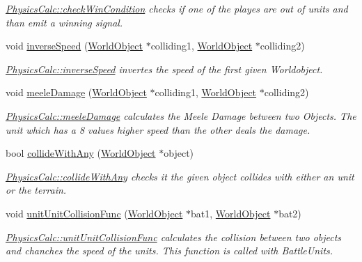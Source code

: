 \begin{DoxyCompactItemize}
\begin{DoxyCompactList}\small\item\em \hyperlink{class_physics_calc_a611a891e2f01de112884cc09f25d1e33}{Physics\+Calc\+::check\+Win\+Condition} checks if one of the playes are out of units and than emit a winning signal. \end{DoxyCompactList}\item 
void \hyperlink{class_physics_calc_a22379e7ef119411e03fc8c4ba211c724}{inverse\+Speed} (\hyperlink{class_world_object}{World\+Object} $\ast$colliding1, \hyperlink{class_world_object}{World\+Object} $\ast$colliding2)
\begin{DoxyCompactList}\small\item\em \hyperlink{class_physics_calc_a22379e7ef119411e03fc8c4ba211c724}{Physics\+Calc\+::inverse\+Speed} invertes the speed of the first given Worldobject. \end{DoxyCompactList}\item 
void \hyperlink{class_physics_calc_a10a603c3fb290521b301a19600c067c4}{meele\+Damage} (\hyperlink{class_world_object}{World\+Object} $\ast$colliding1, \hyperlink{class_world_object}{World\+Object} $\ast$colliding2)
\begin{DoxyCompactList}\small\item\em \hyperlink{class_physics_calc_a10a603c3fb290521b301a19600c067c4}{Physics\+Calc\+::meele\+Damage} calculates the Meele Damage between two Objects. The unit which has a 8 values higher speed than the other deals the damage. \end{DoxyCompactList}\item 
bool \hyperlink{class_physics_calc_a8529b4af50316ef96a6bcbd029c39077}{collide\+With\+Any} (\hyperlink{class_world_object}{World\+Object} $\ast$object)
\begin{DoxyCompactList}\small\item\em \hyperlink{class_physics_calc_a8529b4af50316ef96a6bcbd029c39077}{Physics\+Calc\+::collide\+With\+Any} checks it the given object collides with either an unit or the terrain. \end{DoxyCompactList}\item 
void \hyperlink{class_physics_calc_aacab28a38556f2a29e52068f09a3a4f0}{unit\+Unit\+Collision\+Func} (\hyperlink{class_world_object}{World\+Object} $\ast$bat1, \hyperlink{class_world_object}{World\+Object} $\ast$bat2)
\begin{DoxyCompactList}\small\item\em \hyperlink{class_physics_calc_aacab28a38556f2a29e52068f09a3a4f0}{Physics\+Calc\+::unit\+Unit\+Collision\+Func} calculates the collision between two objects and chanches the speed of the units. This function is called with Battle\+Units. \end{DoxyCompactList}\item 

\end{DoxyCompactItemize}
